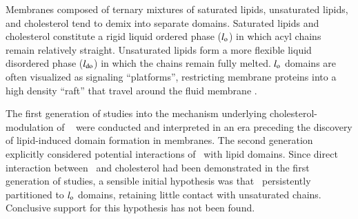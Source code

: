 Membranes composed of ternary mixtures of saturated lipids, unsaturated lipids, and cholesterol tend to demix into separate domains. Saturated lipids and cholesterol constitute a rigid liquid ordered phase ($l_{\mathrm{o}}$) in which acyl chains remain relatively straight.  Unsaturated lipids form a more flexible liquid disordered phase ($l_{\mathrm{do}}$) in which the chains remain fully melted.  %
$l_{\mathrm{o}}$ domains are often visualized as signaling ``platforms'', restricting membrane proteins into a high density ``raft'' that travel around the fluid membrane . 

The first generation of studies into the mechanism underlying cholesterol-modulation of \nachr~ were conducted and interpreted in an era preceding the discovery of lipid-induced domain formation in membranes. %
The second generation explicitly considered potential interactions of \nachr~with lipid domains.  Since direct interaction between \nachr~and cholesterol had been demonstrated in the first generation of studies, a sensible initial hypothesis was that \nachr~persistently partitioned to $l_{\mathrm{o}}$ domains, retaining little contact with unsaturated chains. Conclusive support for this hypothesis has not been found.  %

